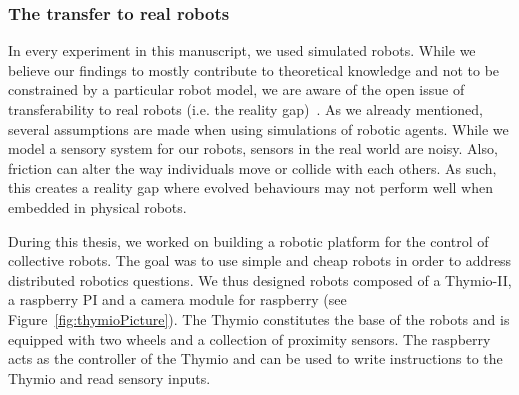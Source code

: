 		\subsubsection{The transfer to real robots}

			In every experiment in this manuscript, we used simulated robots. While we believe our findings to mostly contribute to theoretical knowledge and not to be constrained by a particular robot model, we are aware of the open issue of transferability to real robots (i.e. the reality gap)~\parencite{Jakobi1995, Mouret2012b, Doncieux2015a}. As we already mentioned, several assumptions are made when using simulations of robotic agents. While we model a sensory system for our robots, sensors in the real world are noisy. Also, friction can alter the way individuals move or collide with each others. As such, this creates a reality gap where evolved behaviours may not perform well when embedded in physical robots.

			During this thesis, we worked on building a robotic platform for the control of collective robots. The goal was to use simple and cheap robots in order to address distributed robotics questions. We thus designed robots composed of a Thymio-II, a raspberry PI and a camera module for raspberry (see Figure~\ref{fig:thymioPicture}). The Thymio constitutes the base of the robots and is equipped with two wheels and a collection of proximity sensors. The raspberry acts as the controller of the Thymio and can be used to write instructions to the Thymio and read sensory inputs.

